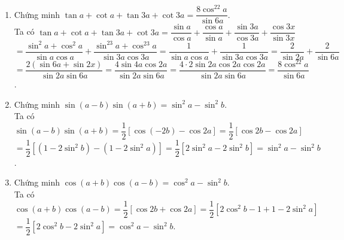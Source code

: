 \begin{bt}
{\begin{enumerate}
			Ta có $4\sin x\sin \left(\dfrac{\pi}{3}-x\right)\sin \left(\dfrac{\pi}{3}+x\right)=4\sin x\cdot \dfrac{1}{2}\left[\cos (-2x)-\cos \dfrac{2\pi}{3}\right]$ \\
			$=2\sin x\cos 2x+\sin x=\sin 3x+\sin (-x)+\sin x=\sin 3x$.
			\item Chứng minh $\tan a+\cot a+\tan 3a+\cot 3a=\dfrac{8\cos^22a}{\sin 6a}$.\\
			Ta có $\tan a+\cot a+\tan 3a+\cot 3a=\dfrac{\sin a}{\cos a}+\dfrac{\cos a}{\sin a}+\dfrac{\sin 3a}{\cos 3a}+\dfrac{\cos 3x}{\sin 3x}$ \\
			$=\dfrac{\sin^2a+\cos^2a}{\sin a\cos a}+\dfrac{\sin^23a+\cos^23a}{\sin 3a\cos 3a}=\dfrac{1}{\sin a\cos a}+\dfrac{1}{\sin 3a\cos 3a}=\dfrac{2}{\sin 2a}+\dfrac{2}{\sin 6a}$ \\
			$=\dfrac{2\left(\sin 6a+\sin 2x\right)}{\sin 2a\sin 6a}=\dfrac{4\sin 4a\cos 2a}{\sin 2a\sin 6a}=\dfrac{4\cdot2\sin 2a\cos 2a\cos 2a}{\sin 2a\sin 6a}=\dfrac{8\cos^22a}{\sin 6a}$.
			\item Chứng minh $\sin (a-b)\sin (a+b)=\sin^2a-\sin^2b$.\\
			Ta có $\sin (a-b)\sin (a+b)=\dfrac{1}{2}\left[\cos (-2b)-\cos 2a\right]=\dfrac{1}{2}\left[\cos 2b-\cos 2a\right]$ \\
			$=\dfrac{1}{2}\left[\left(1-2\sin^2b\right)-\left(1-2\sin^2a\right)\right]=\dfrac{1}{2}\left[2\sin^2a-2\sin^2b\right]=\sin^2a-\sin^2b$.
			\item Chứng minh $\cos (a+b)\cos (a-b)=\cos^2a-\sin^2b$.\\
			Ta có $\cos (a+b)\cos (a-b)=\dfrac{1}{2}\left[\cos 2b+\cos 2a\right]=\dfrac{1}{2}\left[2\cos^2b-1+1-2\sin^2a\right]$ \\
			$=\dfrac{1}{2}\left[2\cos^2b-2\sin^2a\right]=\cos^2a-\sin^2b$.
		\end{enumerate}	
	}
\end{bt}
